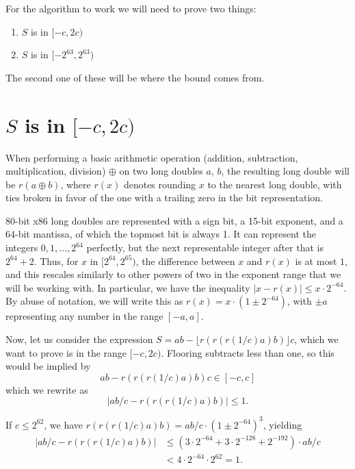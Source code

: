 \documentclass{article}
\begin{document}
For the algorithm to work we will need to prove two things:
\begin{enumerate}
    \item $S$ is in $[-c, 2c)$
    \item $S$ is in $[-2^{63}, 2^{63})$
\end{enumerate}

The second one of these will be where the bound comes from.

\section{$S$ is in $[-c, 2c)$}

When performing a basic arithmetic operation (addition, subtraction, multiplication, division) $\oplus$ on two long doubles $a$, $b$, the resulting long double will be $r(a \oplus b)$, where $r(x)$ denotes rounding $x$ to the nearest long double, with ties broken in favor of the one with a trailing zero in the bit representation.

80-bit x86 long doubles are represented with a sign bit, a 15-bit exponent, and a 64-bit mantissa, of which the topmost bit is always 1.
It can represent the integers $0, 1, \dots, 2^{64}$ perfectly, but the next representable integer after that is $2^{64} + 2$.
Thus, for $x$ in $[2^{64}, 2^{65})$, the difference between $x$ and $r(x)$ is at most $1$, and this rescales similarly to other powers of two in the exponent range that we will be working with. In particular, we have the inequality $|x - r(x)| \le x \cdot 2^{-64}$. By abuse of notation, we will write this as $r(x) = x \cdot (1 \pm 2^{-64})$, with $\pm a$ representing any number in the range $[-a, a]$.

Now, let us consider the expression $S = ab - \lfloor r(r(r(1/c)a)b) \rfloor c$, which we want to prove is in the range $[-c, 2c)$. Flooring subtracts less than one, so this would be implied by
\[ ab - r(r(r(1/c)a)b) c \in [-c, c] \]
which we rewrite as
\[ |ab/c - r(r(r(1/c)a)b)| \le 1. \]

If $c \le 2^{62}$, we have $r(r(r(1/c)a)b) = ab/c\cdot(1 \pm 2^{-64})^3$, yielding
\begin{align*}
|ab/c - r(r(r(1/c)a)b)| &\le (3\cdot 2^{-64} + 3 \cdot 2^{-128} + 2^{-192}) \cdot ab/c \\
                      &< 4\cdot 2^{-64} \cdot 2^{62} = 1.
\end{align*}
\end{document}
